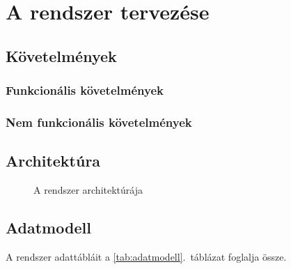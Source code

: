 \chapter{A rendszer tervezése}
\label{ch:tervezes}

\section{Követelmények}
\subsection{Funkcionális követelmények}

\subsection{Nem funkcionális követelmények}

\section{Architektúra}

\begin{figure}[H]
  \centering
  \caption{A rendszer architektúrája}
  \label{fig:architektura}
\end{figure}

\section{Adatmodell}
A rendszer adattábláit a \ref{tab:adatmodell}.~táblázat foglalja össze.

